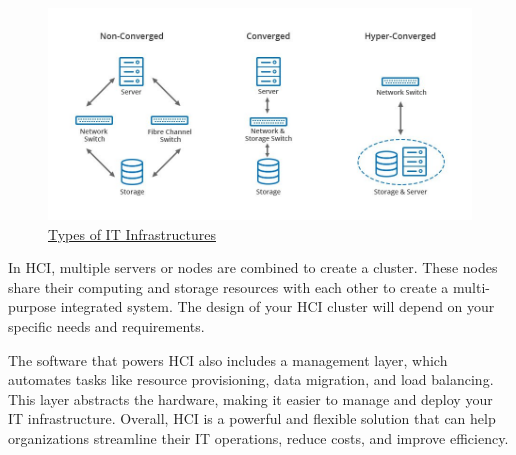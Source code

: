 \begin{figure}[H]
    \centering
    \includegraphics[scale = 0.5]{images/HCI_tldr.jpg}
    \caption{\href{https://en.wikipedia.org/wiki/Hyper-converged_infrastructure}{Types of IT Infrastructures}}
    \label{HCI Convergance Comparison}
\end{figure}

In HCI, multiple servers or nodes are combined to create a cluster. These nodes share their computing and storage resources with each other to create a multi-purpose integrated system. The design of your HCI cluster will depend on your specific needs and requirements.

The software that powers HCI also includes a management layer, which automates tasks like resource provisioning, data migration, and load balancing. This layer abstracts the hardware, making it easier to manage and deploy your IT infrastructure. Overall, HCI is a powerful and flexible solution that can help organizations streamline their IT operations, reduce costs, and improve efficiency.

